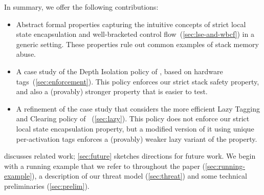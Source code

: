 \documentclass[acmsmall,review,anonymous]{acmart}\settopmatter{printfolios=true,printccs=false,printacmref=false}
\begin{document}
In summary, we offer the following contributions:
\begin{itemize}
\item
  Abstract formal properties capturing the
  intuitive concepts of strict local state encapsulation and well-bracketed
  control flow~(\cref{sec:lse-and-wbcf}) in a generic setting. These properties
  rule out common examples of stack memory abuse.
\item
  A case study of the Depth Isolation policy of \citet{DBLP:conf/sp/RoesslerD18}, based on hardware tags~(\cref{sec:enforcement}).
  This policy enforces our strict stack safety property, and also a (provably) stronger property that is easier to test.
   
\item
  A refinement of the case study that considers the more efficient Lazy Tagging and Clearing policy
  of \citet{DBLP:conf/sp/RoesslerD18}~(\cref{sec:lazy}).  This policy does not enforce our strict
  local state encapsulation property,
  but a modified version of it using unique per-activation tags enforces
  a (provably) weaker lazy variant of the property.
%

\end{itemize}
 discusses related work;
\cref{sec:future} sketches directions for future work.
%
We begin with a running example that we refer to throughout the paper
(\cref{sec:running-example}), a description of our threat model
(\cref{sec:threat}) and some technical preliminaries
(\cref{sec:prelim}).
\end{document}
